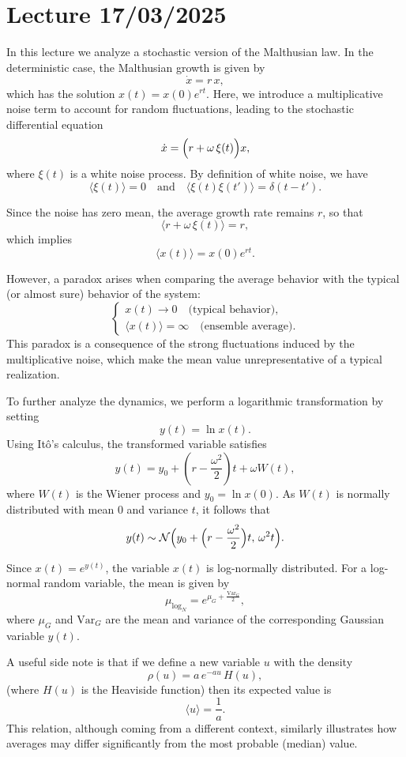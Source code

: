\newpage
\chapter{Lecture 17/03/2025}

In this lecture we analyze a stochastic version of the Malthusian law. In the deterministic case, the Malthusian growth is given by
$$
\dot{x} = r\, x,
$$
which has the solution $x(t)=x(0)e^{rt}$. Here, we introduce a multiplicative noise term to account for random fluctuations, leading to the stochastic differential equation
$$
\dot{x} = \Bigl(r + \omega\, \xi(t)\Bigr)x,
$$
where $\xi(t)$ is a white noise process. By definition of white noise, we have
$$
\langle \xi(t) \rangle = 0 \quad \text{and} \quad \langle \xi(t)\xi(t') \rangle = \delta(t-t').
$$

Since the noise has zero mean, the average growth rate remains $r$, so that
$$
\langle r + \omega\, \xi(t) \rangle = r,
$$
which implies
$$
\langle x(t) \rangle = x(0)e^{rt}.
$$

However, a paradox arises when comparing the average behavior with the typical (or almost sure) behavior of the system:
$$
\begin{cases}
x(t) \to 0 \quad \text{(typical behavior)}, \\
\langle x(t) \rangle = \infty \quad \text{(ensemble average)}.
\end{cases}
$$
This paradox is a consequence of the strong fluctuations induced by the multiplicative noise, which make the mean value unrepresentative of a typical realization.

To further analyze the dynamics, we perform a logarithmic transformation by setting
$$
y(t)=\ln x(t).
$$
Using Itô's calculus, the transformed variable satisfies
$$
y(t)= y_0 + \left(r - \frac{\omega^2}{2}\right)t + \omega W(t),
$$
where $W(t)$ is the Wiener process and $y_0=\ln x(0)$. As $W(t)$ is normally distributed with mean $0$ and variance $t$, it follows that
$$
y(t) \sim \mathcal{N}\Bigl(y_0+\Bigl(r-\frac{\omega^2}{2}\Bigr)t,\, \omega^2 t\Bigr).
$$

Since $x(t)=e^{y(t)}$, the variable $x(t)$ is log-normally distributed. For a log-normal random variable, the mean is given by
$$
\mu_{\log_N} = e^{\mu_G + \frac{\text{Var}_G}{2}},
$$
where $\mu_G$ and $\text{Var}_G$ are the mean and variance of the corresponding Gaussian variable $y(t)$.

A useful side note is that if we define a new variable $u$ with the density
$$
\rho(u) = a\, e^{-au}\, H(u),
$$
(where $H(u)$ is the Heaviside function) then its expected value is
$$
\langle u \rangle = \frac{1}{a}.
$$
This relation, although coming from a different context, similarly illustrates how averages may differ significantly from the most probable (median) value.


